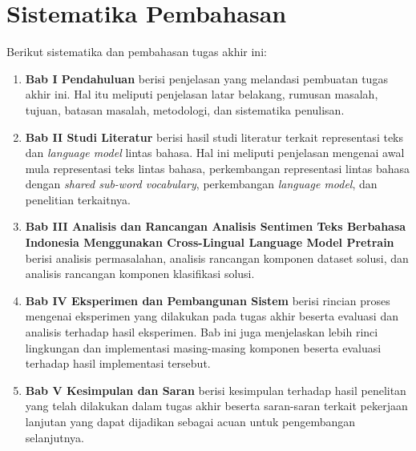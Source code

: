 \section{Sistematika Pembahasan}
Berikut sistematika dan pembahasan tugas akhir ini:
\begin{enumerate}
	\item \textbf{Bab I Pendahuluan} berisi penjelasan yang melandasi pembuatan tugas akhir ini. Hal itu meliputi penjelasan latar belakang, rumusan masalah, tujuan, batasan masalah, metodologi, dan sistematika penulisan.
	\item \textbf{Bab II Studi Literatur} berisi hasil studi literatur terkait representasi teks dan \textit{language model} lintas bahasa. Hal ini meliputi penjelasan mengenai awal mula representasi teks lintas bahasa, perkembangan representasi lintas bahasa dengan \textit{shared sub-word vocabulary}, perkembangan \textit{language model}, dan penelitian terkaitnya.
	\item \textbf{Bab III Analisis dan Rancangan Analisis Sentimen Teks Berbahasa Indonesia Menggunakan Cross-Lingual Language Model Pretrain} berisi analisis permasalahan, analisis rancangan komponen dataset solusi, dan analisis rancangan komponen klasifikasi solusi.
	\item \textbf{Bab IV Eksperimen dan Pembangunan Sistem} berisi rincian proses mengenai eksperimen yang dilakukan pada tugas akhir beserta evaluasi dan analisis terhadap hasil eksperimen. Bab ini juga menjelaskan lebih rinci lingkungan dan implementasi masing-masing komponen beserta evaluasi terhadap hasil implementasi tersebut.
	\item \textbf{Bab V Kesimpulan dan Saran} berisi kesimpulan terhadap hasil penelitan yang telah dilakukan dalam tugas akhir beserta saran-saran terkait pekerjaan lanjutan yang dapat dijadikan sebagai acuan untuk pengembangan selanjutnya.
\end{enumerate}





